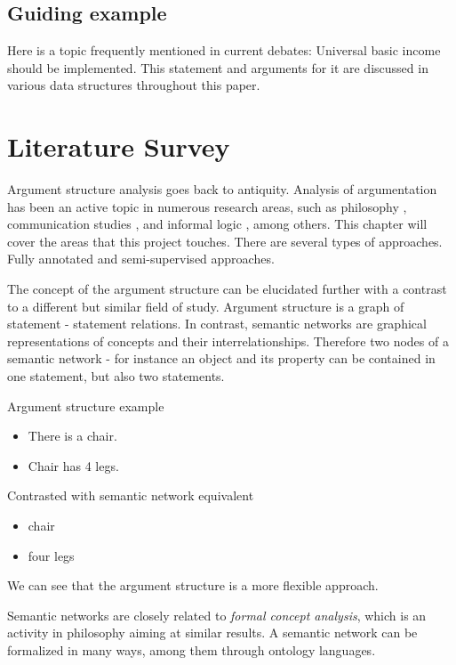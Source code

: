 \documentclass{report}
\begin{document}
\section{Guiding example}

Here is a topic frequently mentioned in current debates: Universal basic income should be implemented.
This statement and arguments for it are discussed in various data structures throughout this paper.

\chapter{Literature Survey}
Argument structure analysis goes back to antiquity. \cite{angelelli_techniques_1970}
Analysis of argumentation has been an active topic in numerous research areas, such as philosophy \cite{van_eemeren_systematic_2003}, communication studies \cite{mercier_why_2011}, and informal logic \cite{blair_informal_2000}, among others. This chapter will cover the areas that this project touches. There are several types of approaches. Fully annotated and semi-supervised approaches.

The concept of the argument structure can be elucidated further with a contrast to a different but similar field of study.
Argument structure is a graph of statement - statement relations.
In contrast, semantic networks \cite{noauthor_semantic_2023} are graphical representations of concepts and their interrelationships. Therefore two nodes of a semantic network - for instance an object and its property can be contained in one statement, but also two statements.

Argument structure example
\begin{itemize}
  \item There is a chair.
  \item Chair has 4 legs.
\end{itemize}

Contrasted with semantic network equivalent
\begin{itemize}
  \item chair
  \item four legs
\end{itemize}
We can see that the argument structure is a more flexible approach.

Semantic networks are closely related to \textit{formal concept analysis}, which is an activity in philosophy aiming at similar results. A semantic network can be formalized in many ways, among them through ontology languages.
\end{document}
